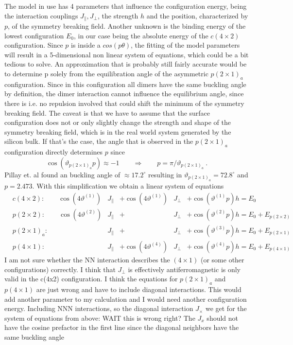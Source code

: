 	The model in use has 4 parameters that influence the configuration energy, being the interaction couplings $J_\parallel, J_\perp$, the strength $h$ and the position, characterized by $p$, of the symmetry breaking field. Another unknown is the binding energy of the lowest configuration $E_0$, in our case being the absolute energy of the $c(4\times2)$ configuration. Since $p$ is inside a $cos(p\theta)$, the fitting of the model parameters will result in a 5-dimensional non linear system of equations, which could be a bit tedious to solve. An approximation that is probably still fairly accurate would be to determine p solely from the equilibration angle of the asymmetric $p(2\times1)_a$ configuration. Since in this configuration all dimers have the same buckling angle by definition, the dimer interaction cannot influence the equilibrium angle, since there is i.e. no repulsion involved that could shift the minimum of the symmetry breaking field. The caveat is that we have to assume that the surface configuration does not or only slightly change the strength and shape of the symmetry breaking field, which is in the real world system generated by the silicon bulk. If that's the case, the angle that is observed in the $p(2\times1)_a$ configuration directly determines $p$ since
	\begin{equation}
		\cos \left(\vartheta_{p(2\times1)_a} p \right) \approx -1 \qquad \Rightarrow \qquad  p =	\pi /	\vartheta_{p(2\times1)_a} ~.
	\end{equation}
	Pillay et. al \cite{pillay2004revisit} found an buckling angle of $\approx 17.2^\circ$ resulting in $\vartheta_{p(2 \times 1)_a} =	72.8^\circ$ and $p =	2.473$. With this simplification we obtain a linear system of equations
	\begin{align}
		&c(4\times2): 	\qquad \cos(4\vartheta^{(1)})&J_\parallel&+ \cos(4\vartheta^{(1)})&J_\perp&+\cos \left(\vartheta^{(1)}p\right) h =	E_0 \\
		&p(2\times2): 	\qquad \cos(4\vartheta^{(2)})&J_\parallel&+&J_\perp&+ \cos \left(\vartheta^{(2)}p\right) h =	E_0 + E_{p(2\times 2)} \\
		&p(2\times1)_a: 	\qquad  &J_\parallel&+&J_\perp&+ \cos \left(\vartheta^{(3)}p\right) h =	E_0 + E_{p(2\times 1)} \\
		&p(4\times1): 	\qquad \
		&J_\parallel&+\cos\left(4\vartheta^{(4)}\right)&J_\perp&+ \cos \left(\vartheta^{(4)}p\right) h =	E_0 + E_{p(4\times 1)}
	\end{align}
	I am not sure whether the NN interaction describes the $(4\times 1)$ (or some other configurations) correctly. I think that $J_\perp$ is effectively antiferromagnetic is only valid in the c(4x2) configuration. I think the equations for $p(2\times 1)_a$ and $p(4\times1)$ are just wrong and have to include diagonal interactions. This would add another parameter to my calculation and I would need another configuration energy. Including NNN interactions, so the diagonal interaction $J_\times$ we get for the system of equations from above: WAIT this is wrong right? The $J_x$ should not have the cosine prefactor in the first line since the diagonal neighbors have the same buckling angle
